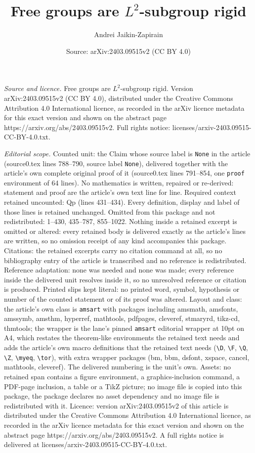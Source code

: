 \documentclass[10pt,a4paper]{amsart}
\title[Free groups are $L^2$-subgroup rigid]{Free groups are $L^2$-subgroup rigid}
\author{Andrei Jaikin-Zapirain}
\date{Source: arXiv:2403.09515v2 (CC BY 4.0)}
\begin{document}
\maketitle

\noindent\emph{Source and licence.} Free groups are $L^2$-subgroup rigid. Version arXiv:2403.09515v2 (CC BY 4.0), distributed under the Creative Commons Attribution 4.0 International licence, as recorded in the arXiv licence metadata for this exact version and shown on the abstract page https://arxiv.org/abs/2403.09515v2. Full rights notice: licenses/arxiv-2403.09515-CC-BY-4.0.txt.\par\smallskip

\noindent\textit{Editorial scope.} Counted unit: the Claim whose source label is \texttt{None} in the article (source0.tex lines 788--790, source label \texttt{None}), delivered together with the article's own complete original proof of it (source0.tex lines 791--854, one \texttt{proof} environment of 64 lines). No mathematics is written, repaired or re-derived: statement and proof are the article's own text line for line. Required context retained uncounted: Qp (lines 431--434). Every definition, display and label of those lines is retained unchanged. Omitted from this package and not redistributed: 1--430, 435--787, 855--1022. Nothing inside a retained excerpt is omitted or altered: every retained body is delivered exactly as the article's lines are written, so no omission receipt of any kind accompanies this package. Citations: the retained excerpts carry no citation command at all, so no bibliography entry of the article is transcribed and no reference is redistributed. Reference adaptation: none was needed and none was made; every reference inside the delivered unit resolves inside it, so no unresolved reference or citation is produced. Printed slips kept literal: no printed word, symbol, hypothesis or number of the counted statement or of its proof was altered. Layout and class: the article's own class is \texttt{amsart} with packages including amsmath, amsfonts, amssymb, amsthm, hyperref, mathtools, pdfpages, cleveref, stmaryrd, tikz-cd, thmtools; the wrapper is the lane's pinned \texttt{amsart} editorial wrapper at 10pt on A4, which restates the theorem-like environments the retained text needs and adds the article's own macro definitions that the retained text needs (\texttt{\textbackslash D}, \texttt{\textbackslash F}, \texttt{\textbackslash Q}, \texttt{\textbackslash Z}, \texttt{\textbackslash myeq}, \texttt{\textbackslash tor}), with extra wrapper packages (bm, bbm, dsfont, xspace, cancel, mathtools, cleveref). The delivered numbering is the unit's own. Assets: no retained span contains a figure environment, a graphics-inclusion command, a PDF-page inclusion, a table or a TikZ picture; no image file is copied into this package, the package declares no asset dependency and no image file is redistributed with it. Licence: version arXiv:2403.09515v2 of this article is distributed under the Creative Commons Attribution 4.0 International licence, as recorded in the arXiv licence metadata for this exact version and shown on the abstract page https://arxiv.org/abs/2403.09515v2. A full rights notice is delivered at licenses/arxiv-2403.09515-CC-BY-4.0.txt. 
\end{document}
